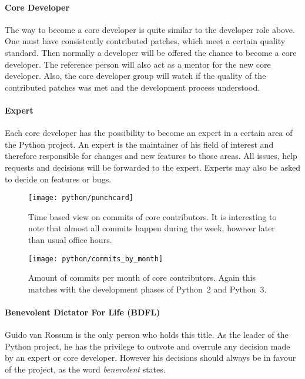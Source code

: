 \paragraph{Core Developer}

The way to become a core developer is quite similar to the developer role
above. One must have consistently contributed patches, which meet a certain
quality standard. Then normally a developer will be offered the chance to
become a core developer. The reference person will also act as a mentor for the
new core developer. Also, the core developer group will watch if the quality of
the contributed patches was met and the development process understood.

\paragraph{Expert}

Each core developer has the possibility to become an expert in a certain area
of the Python project. An expert is the maintainer of his field of interest and
therefore responsible for changes and new features to those areas. All issues,
help requests and decisions will be forwarded to the expert. Experts may also
be asked to decide on features or bugs.

\begin{figure}[hbtp]
  \centering
  \texttt{[image: python/punchcard]}
  \caption[Time Based View on Commits, Python]
  {Time based view on commits of core contributors. It is interesting to note
    that almost all commits happen during the week, however later than usual
    office hours.}
  \label{fig:python:p}
\end{figure}

\begin{figure}[htbp]
  \centering
  \texttt{[image: python/commits\_by\_month]}
  \caption[Commits by Month, Python]
  {Amount of commits per month of core contributors. Again this matches with
    the development phases of Python~2 and Python~3.}
  \label{fig:python:cbm}
\end{figure}

\paragraph{Benevolent Dictator For Life (BDFL)}

Guido van Rossum is the only person who holds this title. As the leader of the
Python project, he has the privilege to outvote and overrule any decision made
by an expert or core developer. However his decisions should always be in
favour of the project, as the word \emph{benevolent} states.

